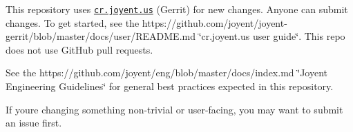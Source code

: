 This repository uses \href{https://cr.joyent.us}{\tt cr.\+joyent.\+us} (Gerrit) for new changes. Anyone can submit changes. To get started, see the https\+://github.com/joyent/joyent-\/gerrit/blob/master/docs/user/\+R\+E\+A\+D\+M\+E.\+md \char`\"{}cr.\+joyent.\+us user
guide\char`\"{}. This repo does not use Git\+Hub pull requests.

See the https\+://github.com/joyent/eng/blob/master/docs/index.\+md \char`\"{}\+Joyent Engineering
\+Guidelines\char`\"{} for general best practices expected in this repository.

If you\textquotesingle{}re changing something non-\/trivial or user-\/facing, you may want to submit an issue first. 
